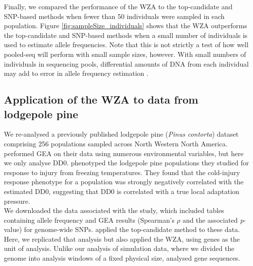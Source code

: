 \documentclass[10pt,twoside,lineno]{GSA_format}
\begin{document}
Finally, we compared the performance of the WZA to the top-candidate and SNP-based methods when fewer than 50 individuals were sampled in each population. Figure \ref{fig:sampleSize_individuals} shows that the WZA outperforms the top-candidate and SNP-based methods when a small number of individuals is used to estimate allele frequencies. Note that this is not strictly a test of how well pooled-seq will perform with small sample sizes, however. With small numbers of individuals in sequencing pools, differential amounts of DNA from each individual may add to error in allele frequency estimation \citep{Schlotterer2014}. 

\subsection{Application of the WZA to data from lodgepole pine}

We re-analysed a previously published \citep{Yeaman2016} lodgepole pine (\textit{Pinus contorta}) dataset comprising 256 populations sampled across North Western North America.\cite{Yeaman2016} performed GEA on their data using numerous environmental variables, but here we only analyse DD0. \cite{Yeaman2016} phenotyped the lodgepole pine populations they studied for response to injury from freezing temperatures. They found that the cold-injury response phenotype for a population was strongly negatively correlated with the estimated DD0, suggesting that DD0 is correlated with a true local adaptation pressure. \\

We downloaded the data associated with the \cite{Yeaman2016} study, which included tables containing allele frequency and GEA results (Spearman's $\rho$ and the associated \textit{p}-value) for genome-wide SNPs. \cite{Yeaman2016} applied the top-candidate method to these data. Here, we replicated that analysis but also applied the WZA, using genes as the unit of analysis. Unlike our analysis of simulation data, where we divided the genome into analysis windows of a fixed physical size, \cite{Yeaman2016} analysed gene sequences. \\
\end{document}
